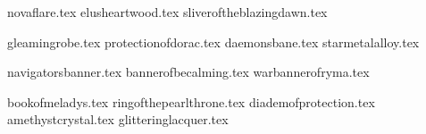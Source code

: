 
\raggedcolumns
\begin{multicols}{2}

	\subtitle{\weaponenchantments}
	
	\startsortedpricelist
	
	{novaflare.tex}
	{elusheartwood.tex}
	{sliveroftheblazingdawn.tex}
	
	\endsortedpricelist

	\subtitle{\armourenchantments}
	
	\startsortedpricelist
	
	{gleamingrobe.tex}
	{protectionofdorac.tex}
	{daemonsbane.tex}
	{starmetalalloy.tex}

	\endsortedpricelist

	\subtitle{\bannerenchantments}

	\startsortedpricelistNSP
	
	{navigatorsbanner.tex}
	{bannerofbecalming.tex}
	{warbannerofryma.tex}

	\endsortedpricelistNSP

	\subtitle{\artefacts}
	
	\startsortedpricelist

	{bookofmeladys.tex}
	{ringofthepearlthrone.tex}
	{diademofprotection.tex}
	{amethystcrystal.tex}
	{glitteringlacquer.tex}

	\endsortedpricelist

\end{multicols}
